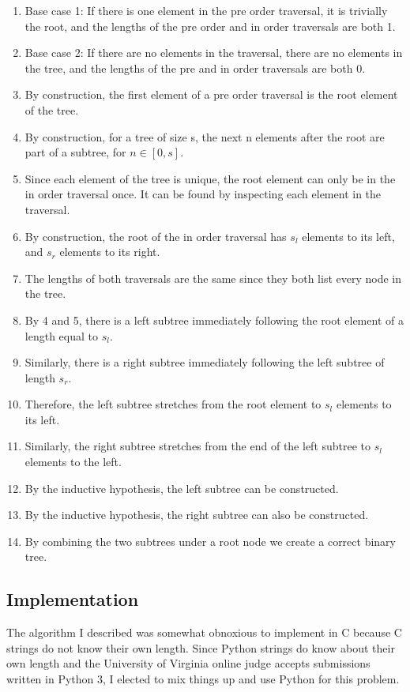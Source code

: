 \documentclass[12pt,letterpaper]{article}
\begin{document}
\begin{enumerate}
\item Base case 1: If there is one element in the pre order traversal, it is
trivially the root, and the lengths of the pre order and in order traversals
are both 1.
\item Base case 2: If there are no elements in the traversal, there are no
elements in the tree, and the lengths of the pre and in order traversals are
both 0.
\item By construction, the first element of a pre order traversal is the root
element of the tree.
\item By construction, for a tree of size s, the next n elements after the root
are part of a subtree, for $n \in [0, s]$.
\item Since each element of the tree is unique, the root element can only be in
the in order traversal once. It can be found by inspecting each element in the
traversal.
\item By construction, the root of the in order traversal has $s_l$ elements to
its left, and $s_r$ elements to its right.
\item The lengths of both traversals are the same since they both list every
node in the tree.
\item By 4 and 5, there is a left subtree immediately following the root
element of a length equal to $s_l$.
\item Similarly, there is a right subtree immediately following the left
subtree of length $s_r$.
\item Therefore, the left subtree stretches from the root element to $s_l$
elements to its left.
\item Similarly, the right subtree stretches from the end of the left subtree
to $s_l$ elements to the left.
\item By the inductive hypothesis, the left subtree can be constructed.
\item By the inductive hypothesis, the right subtree can also be constructed.
\item By combining the two subtrees under a root node we create a correct
binary tree.
\end{enumerate}

\subsection{Implementation}
The algorithm I described was somewhat obnoxious to implement in C because C
strings do not know their own length. Since Python strings do know about their
own length and the University of Virginia online judge accepts submissions
written in Python 3, I elected to mix things up and use Python for this
problem.
\end{document}
